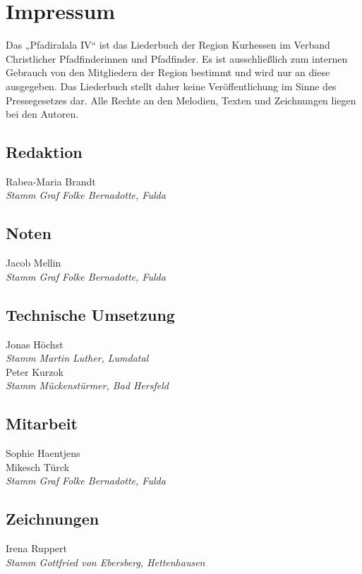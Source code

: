 \section*{Impressum}

\vspace{10pt} Das „Pfadiralala IV“ ist das Liederbuch der Region Kurhessen im Verband Christlicher Pfadfinderinnen und Pfadfinder. Es ist ausschließlich zum internen Gebrauch von den Mitgliedern der Region bestimmt und wird nur an diese ausgegeben. Das Liederbuch stellt daher keine Veröffentlichung im Sinne des Pressegesetzes dar. Alle Rechte an den Melodien, Texten und Zeichnungen liegen bei den Autoren. \\ \vspace{10pt} 

\begin{centering}
\begin{multicols}{2}

\subsection*{Redaktion}
Rabea-Maria Brandt \\ \textit{Stamm Graf Folke Bernadotte, Fulda}

\subsection*{Noten}
Jacob Mellin \\ \textit{Stamm Graf Folke Bernadotte, Fulda}

\subsection*{Technische Umsetzung}
Jonas Höchst \\ \textit{Stamm Martin Luther, Lumdatal}\\ \vspace{10pt}
Peter Kurzok \\ \textit{Stamm Mückenstürmer, Bad Hersfeld}

\subsection*{Mitarbeit}
Sophie Haentjens \\ Mikesch Türck \\
\textit{Stamm Graf Folke Bernadotte, Fulda}

\columnbreak

\subsection*{Zeichnungen}
Irena Ruppert \\ \textit{Stamm Gottfried von Ebersberg, Hettenhausen} \\ \vspace{10pt}


\end{multicols}
\end{centering}
